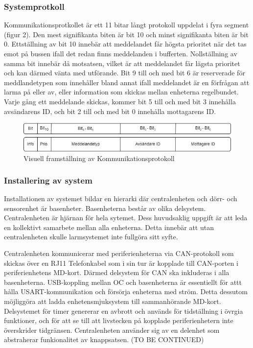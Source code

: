 \documentclass{article}
\begin{document}
\subsubsection{Systemprotkoll}
Kommunikationsprotkollet är ett 11 bitar långt protokoll uppdelat i fyra segment (figur 2).
Den mest signifikanta biten är bit 10 och minst signifikanta biten är bit 0. 
Ettställning av bit 10 innebär att meddelandet får högsta prioritet när det tas emot på bussen ifall det redan finns meddelanden i bufferten.
Nollställning av samma bit innebär då motsatsen, vilket är att meddelandet får lägsta prioritet och kan därmed vänta med utförande. 
Bit 9 till och med bit 6 är reserverade för meddlandetypen som innehåller bland annat ifall meddelandet är en förfrågan att larma på eller av, eller information som skickas mellan enheterna regelbundet. 
Varje gång ett meddelande skickas, kommer bit 5 till och med bit 3 innehålla avsändarens ID, och bit 2 till och med bit 0 innehålla mottagarens ID.

\begin{figure}[h]
    \centering
    \includegraphics[scale=0.5]{Projektrapport/protokoll.png}
    \caption {Visuell framställning av Kommunikationsprotokoll}
    \label{fig:drawing}
\end{figure}

\subsubsection{Installering av system}
Installationen av systemet bildar en hierarki där centralenheten och dörr- och sensorenhet är basenheter. Basenheterna består av olika delsystem. Centralenheten är hjärnan för hela sytemet. Dess huvudsaklig uppgift är att leda en kollektivt samarbete mellan alla enheterna. Detta innebär att utan centralenheten skulle larmsystemet inte fullgöra sitt syfte. 

\noindent Centralenheten kommunicerar med periferienheterna via CAN-protokoll som skickas över en RJ11 Telefonkabel som i sin tur är kopplade till CAN-porten i periferienhetens MD-kort. Därmed delsystem för CAN ska inkluderas i alla basenheterna. USB-koppling mellan OC och basenheterna är essentiellt för attt hålla USART-kommunikation och försörja enheterna med ström. Detta dessutom möjliggöra att ladda enhetensmjuksystem till sammanhörande MD-kort. Delsystemet för timer genererar en avbrott och används för tidställning i övrgia funktioner, och för att se till att livstecken på kopplade periferienhetern inte överskrider tidgränsen. Centralenheten använder sig av en delenhet som abstraherar funkionalitet av knappsatsen. (TO BE CONTINUED)
\end{document}
